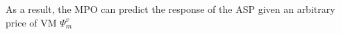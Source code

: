 \documentclass[conference]{IEEEtran}
\begin{document}

As a result, the MPO can predict the response of the ASP given an arbitrary price of VM $\Psi_m^v$
\end{document}
